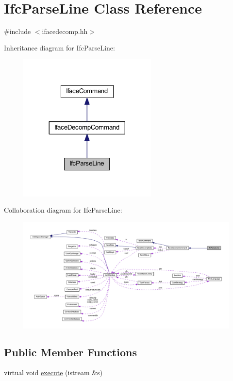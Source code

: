 \hypertarget{class_ifc_parse_line}{}\section{Ifc\+Parse\+Line Class Reference}
\label{class_ifc_parse_line}


{\ttfamily \#include $<$ifacedecomp.\+hh$>$}



Inheritance diagram for Ifc\+Parse\+Line\+:
\nopagebreak
\begin{figure}[H]
\begin{center}
\leavevmode
\includegraphics[width=197pt]{class_ifc_parse_line__inherit__graph}
\end{center}
\end{figure}


Collaboration diagram for Ifc\+Parse\+Line\+:
\nopagebreak
\begin{figure}[H]
\begin{center}
\leavevmode
\includegraphics[width=350pt]{class_ifc_parse_line__coll__graph}
\end{center}
\end{figure}
\subsection*{Public Member Functions}
\begin{DoxyCompactItemize}
\item 
virtual void \mbox{\hyperlink{class_ifc_parse_line_ad1c74b89106a1f71511e80766f389de7}{execute}} (istream \&s)
\end{DoxyCompactItemize}
